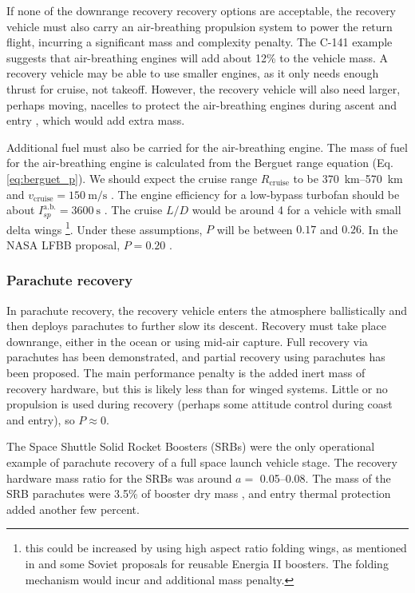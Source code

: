 \documentclass[conf]{new-aiaa}
\begin{document}
If none of the downrange recovery recovery options are acceptable, the recovery vehicle must also carry an air-breathing propulsion system to power the return flight, incurring a significant mass and complexity penalty.
The C-141 example suggests that air-breathing engines will add about 12\% to the vehicle mass. A recovery vehicle may be able to use smaller engines, as it only needs enough thrust for cruise, not takeoff. However, the recovery vehicle will also need larger, perhaps moving, nacelles to protect the air-breathing engines during ascent and entry \cite{Healy1998}, which would add extra mass.

Additional fuel must also be carried for the air-breathing engine. The mass of fuel for the air-breathing engine is calculated from the Berguet range equation (Eq. \ref{eq:berguet_p}). We should expect the cruise range $R_{\mathrm{cruise}}$ to be \SIrange{370}{570}{\kilo\meter} \cite{Healy1998, Hellman2005} and $v_{\mathrm{cruise}} = \SI{150}{\meter\per\second}$ \cite{Healy1998}. The engine efficiency for a low-bypass turbofan should be about $I_{sp}^{\mathrm{a.b.}} = \SI{3600}{\second}$ \cite{Hellman2005}. The cruise $L/D$ would be around 4 for a vehicle with small delta wings \footnote{this could be increased by using high aspect ratio folding wings, as mentioned in \cite{Healy1998} and some Soviet proposals for reusable Energia II boosters. The folding mechanism would incur and additional mass penalty.}. Under these assumptions, $P$ will be between $0.17$ and $0.26$. In the NASA LFBB proposal, $P=0.20$ \cite{Healy1998}.


\subsubsection{Parachute recovery}
In parachute recovery, the recovery vehicle enters the atmosphere ballistically and then deploys parachutes to further slow its descent. Recovery must take place downrange, either in the ocean or using mid-air capture. Full recovery via parachutes has been demonstrated, and partial recovery using parachutes has been proposed. The main performance penalty is the added inert mass of recovery hardware, but this is likely less than for winged systems. Little or no propulsion is used during recovery (perhaps some attitude control during coast and entry), so $P \approx 0$.

The Space Shuttle Solid Rocket Boosters (SRBs) were the only operational example of parachute recovery of a full space launch vehicle stage. The recovery hardware mass ratio for the SRBs was around $a=$ \SIrange{0.05}{0.08}{}. The mass of the SRB parachutes were 3.5\% of booster dry mass \cite{Wolf1996}, and entry thermal protection added another few percent.
\end{document}
